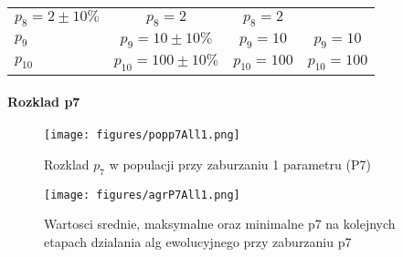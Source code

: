 \documentclass[]{article}
\let\oldparagraph\paragraph
\renewcommand{\paragraph}[1]{\oldparagraph{#1}\mbox{}}
\begin{document}
\begin{longtable}[c]{@{}lccc@{}}
\begin{minipage}[t]{0.26\columnwidth}
\(p_8 = 2 \pm 10 \%\)
\strut\end{minipage} &
\begin{minipage}[t]{0.24\columnwidth}\centering\strut
\(p_8= 2\)
\strut\end{minipage} &
\begin{minipage}[t]{0.26\columnwidth}\centering\strut
\(p_8 =2\)
\strut\end{minipage}\tabularnewline
\begin{minipage}[t]{0.13\columnwidth}\raggedright\strut
\(p_9\)
\strut\end{minipage} &
\begin{minipage}[t]{0.26\columnwidth}\centering\strut
\(p_9 = 10 \pm 10 \%\)
\strut\end{minipage} &
\begin{minipage}[t]{0.24\columnwidth}\centering\strut
\(p_9 =10\)
\strut\end{minipage} &
\begin{minipage}[t]{0.26\columnwidth}\centering\strut
\(p_9 =10\)
\strut\end{minipage}\tabularnewline
\begin{minipage}[t]{0.13\columnwidth}\raggedright\strut
\(p_{10}\)
\strut\end{minipage} &
\begin{minipage}[t]{0.26\columnwidth}\centering\strut
\(p_{10} = 100 \pm 10 \%\)
\strut\end{minipage} &
\begin{minipage}[t]{0.24\columnwidth}\centering\strut
\(p_{10} =100\)
\strut\end{minipage} &
\begin{minipage}[t]{0.26\columnwidth}\centering\strut
\(p_{10} =100\)
\strut\end{minipage}\tabularnewline
\bottomrule
\end{longtable}

\paragraph{Rozklad p7}\label{rozklad-p7-2}

\begin{figure}[htbp]
\centering
\texttt{[image: figures/popp7All1.png]}
\caption{Rozklad \(p_7\) w populacji przy zaburzaniu 1 parametru (P7)}
\end{figure}

\begin{figure}[htbp]
\centering
\texttt{[image: figures/agrP7All1.png]}
\caption{Wartosci srednie, maksymalne oraz minimalne p7 na kolejnych
etapach dzialania alg ewolucyjnego przy zaburzaniu p7}
\end{figure}
\end{document}
